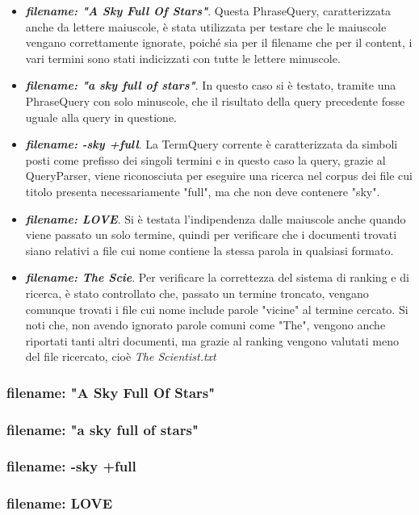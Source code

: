 \documentclass{article}
\begin{document}
\begin{itemize}
    \item \textit{\textbf{filename: "A Sky Full Of Stars"}}. Questa PhraseQuery, caratterizzata anche da lettere maiuscole, è stata utilizzata per testare che le maiuscole vengano correttamente ignorate, poiché sia per il filename che per il content, i vari termini sono stati indicizzati con tutte le lettere minuscole.
    \item \textit{\textbf{filename: "a sky full of stars"}}. In questo caso si è testato, tramite una PhraseQuery con solo minuscole, che il risultato della query precedente fosse uguale alla query in questione.
    \item \textit{\textbf{filename: -sky +full}}. La TermQuery corrente è caratterizzata da simboli posti come prefisso dei singoli termini e in questo caso la query, grazie al QueryParser, viene riconosciuta per eseguire una ricerca nel corpus dei file cui titolo presenta necessariamente "full", ma che non deve contenere "sky".
    \item \textit{\textbf{filename: LOVE}}. Si è testata l'indipendenza dalle maiuscole anche quando viene passato un solo termine, quindi per verificare che i documenti trovati siano relativi a file cui nome contiene la stessa parola in qualsiasi formato.
    \item \textit{\textbf{filename: The Scie}}. Per verificare la correttezza del sistema di ranking e di ricerca, è stato controllato che, passato un termine troncato, vengano comunque trovati i file cui nome include parole "vicine" al termine cercato. Si noti che, non avendo ignorato parole comuni come "The", vengono anche riportati tanti altri documenti, ma grazie al ranking vengono valutati meno del file ricercato, cioè \textit{The Scientist.txt}
\end{itemize}

\iffalse
\subsubsection{filename: "A Sky Full Of Stars"} \label{PQUpper}
\subsubsection{filename: "a sky full of stars"}
\subsubsection{filename: -sky +full} \label{TQSymbols}
\subsubsection{filename: LOVE}
\end{document}
